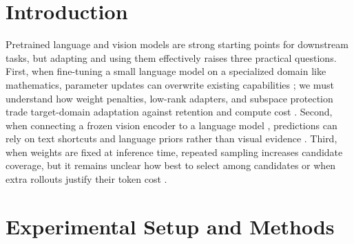 \documentclass{article}
\begin{document}
\section{Introduction}
\label{sec:intro}

Pretrained language and vision models are strong starting points for downstream tasks, but adapting and using them effectively raises three practical questions. First, when fine-tuning a small language model on a specialized domain like mathematics, parameter updates can overwrite existing capabilities \citep{biderman2024lora}; we must understand how weight penalties, low-rank adapters, and subspace protection trade target-domain adaptation against retention and compute cost \citep{li2018l2sp, xiong2026oplora}. Second, when connecting a frozen vision encoder \citep{zhai2023siglip} to a language model \citep{liu2023llava}, predictions can rely on text shortcuts and language priors rather than visual evidence \citep{goyal2017vqav2}. Third, when weights are fixed at inference time, repeated sampling increases candidate coverage, but it remains unclear how best to select among candidates or when extra rollouts justify their token cost \citep{wang2023selfconsistency, aggarwal2023adaptiveconsistency, kang2025selfcertainty, usman2026visconf, madaan2023selfrefine}.

\section{Experimental Setup and Methods}
\label{sec:setup}
\end{document}
